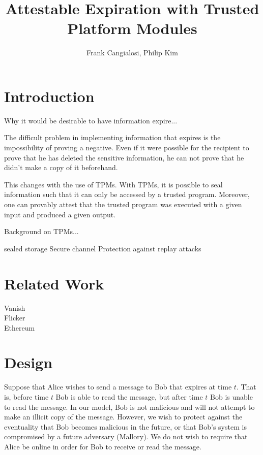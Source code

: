 \documentclass{article}
\begin{document}
\title{Attestable Expiration with Trusted Platform Modules}
\author{Frank Cangialosi, Philip Kim}

\maketitle

\section{Introduction}

Why it would be desirable to have information expire...

The difficult problem in implementing information that expires is the impossibility of proving a negative. Even if it were possible for the recipient to prove that he has deleted the sensitive information, he can not prove that he didn't make a copy of it beforehand.

This changes with the use of TPMs. With TPMs, it is possible to seal information such that it can only be accessed by a trusted program. Moreover, one can provably attest that the trusted program was executed with a given input and produced a given output.

Background on TPMs...

sealed storage
Secure channel
Protection against replay attacks


\section{Related Work}

Vanish\\

Flicker\\

Ethereum\\

\section{Design}

Suppose that Alice wishes to send a message to Bob that expires at time $t$. That is, before time $t$ Bob is able to read the message, but after time $t$ Bob is unable to read the message. In our model, Bob is not malicious and will not attempt to make an illicit copy of the message. However, we wish to protect against the eventuality that Bob becomes malicious in the future, or that Bob's system is compromised by a future adversary (Mallory). We do not wish to require that Alice be online in order for Bob to receive or read the message.
\end{document}
